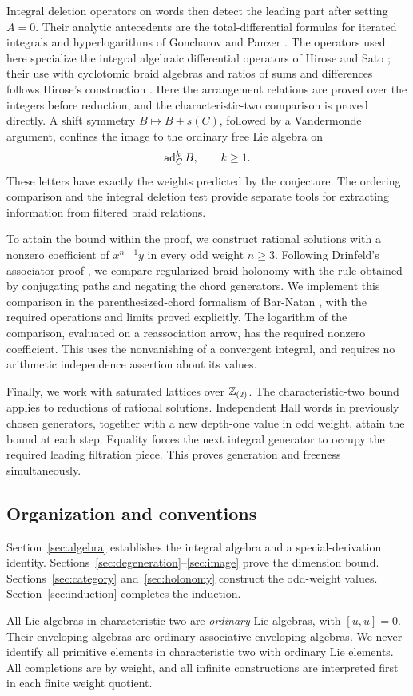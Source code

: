 Integral deletion operators on words then detect the leading part
after setting \(A=0\).  Their analytic antecedents are the
total-differential formulas for iterated integrals and hyperlogarithms
of Goncharov \cite[Theorem~2.1]{Goncharov} and
Panzer \cite[Lemma~3.3.30]{Panzer}.
The operators used here specialize the integral
algebraic differential operators of Hirose and Sato
\cite[Section~2]{HiroseSato}; their use with cyclotomic braid algebras
and ratios of sums and differences follows Hirose's construction
\cite[Sections~4.3 and~6]{Hirose}.  Here the arrangement relations are proved over the
integers before reduction, and the characteristic-two comparison is
proved directly.  A shift symmetry
\(B\mapsto B+s(C)\), followed by a Vandermonde argument, confines the
image to the ordinary free Lie algebra on
\[
 \operatorname{ad}_C^kB,\qquad k\ge1.
\]
These letters have exactly the weights predicted by the conjecture.
The ordering comparison and the integral deletion test provide
separate tools for extracting information from filtered braid
relations.

To attain the bound within the proof, we construct rational solutions with a nonzero
coefficient of \(x^{n-1}y\) in every odd weight \(n\ge3\).
Following Drinfeld's associator proof
\cite[Proposition~6.3]{Drinfeld}, we compare regularized braid holonomy
with the rule obtained by conjugating paths and negating the chord
generators.  We implement
this comparison in the parenthesized-chord formalism of Bar-Natan
\cite[Sections~2--3]{BarNatan}, with the required operations and
limits proved explicitly.  The logarithm of the comparison,
evaluated on a reassociation arrow, has the required nonzero
coefficient.  This uses the nonvanishing of a convergent integral,
and requires no arithmetic independence assertion about its values.

Finally, we work with saturated lattices over \(\mathbb Z_{(2)}\).
The characteristic-two bound applies to reductions of rational
solutions.  Independent Hall words in previously chosen generators,
together with a new depth-one value in odd weight, attain the bound
at each step.
Equality forces the next integral generator to occupy the required
leading filtration piece.  This proves generation and freeness
simultaneously.

\subsection{Organization and conventions}
Section~\ref{sec:algebra} establishes the integral algebra and a
special-derivation identity.  Sections~\ref{sec:degeneration}--\ref{sec:image}
prove the dimension bound.  Sections~\ref{sec:category}
and~\ref{sec:holonomy} construct the odd-weight values.
Section~\ref{sec:induction} completes the induction.

All Lie algebras in characteristic two are \emph{ordinary} Lie
algebras, with \([u,u]=0\).  Their enveloping algebras are ordinary
associative enveloping algebras.  We never identify all primitive
elements in characteristic two with ordinary Lie elements.
All completions are by weight, and all infinite constructions are
interpreted first in each finite weight quotient.
